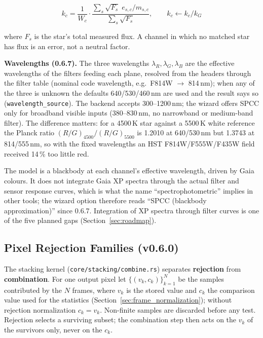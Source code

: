 \documentclass[11pt,a4paper]{article}
\newcommand{\code}[1]{\texttt{\small #1}}
\begin{document}
    \begin{equation}
        \boxed{
            k_c = \frac{1}{W_c} \cdot \frac{\sum_s \sqrt{F_s}\; e_{s,c} / m_{s,c}}{\sum_s \sqrt{F_s}}, \qquad k_c \leftarrow k_c / k_G
        }
    \end{equation}

    where $F_s$ is the star's total measured flux. A channel in which no matched star has flux is an error, not a neutral factor.

    \textbf{Wavelengths (0.6.7).} The three wavelengths $\lambda_R, \lambda_G, \lambda_B$ are the effective wavelengths of the filters feeding each plane, resolved from the headers through the filter table (nominal code wavelength, e.g.\ F814W $\to$ 814\,nm); when any of the three is unknown the defaults 640/530/460\,nm are used and the result says so (\code{wavelength\_source}). The backend accepts 300--1200\,nm; the wizard offers SPCC only for broadband visible inputs (380--830\,nm, no narrowband or medium-band filter). The difference matters: for a 4500\,K star against a 5500\,K white reference the Planck ratio $(R/G)_{4500}/(R/G)_{5500}$ is 1.2010 at 640/530\,nm but 1.3743 at 814/555\,nm, so with the fixed wavelengths an HST F814W/F555W/F435W field received 14\,\% too little red.

    \begin{notebox}
        The model is a blackbody at each channel's effective wavelength, driven by Gaia colours. It does not integrate Gaia XP spectra through the actual filter and sensor response curves, which is what the name ``spectrophotometric'' implies in other tools; the wizard option therefore reads ``SPCC (blackbody approximation)'' since 0.6.7. Integration of XP spectra through filter curves is one of the five planned gaps (Section~\ref{sec:roadmap}).
    \end{notebox}


    \subsection{Pixel Rejection Families (v0.6.0)}
    \label{sec:rejection_families}

    The stacking kernel (\code{core/stacking/combine.rs}) separates \textbf{rejection} from \textbf{combination}. For one output pixel let $\{(v_k, c_k)\}_{k=1}^{N}$ be the samples contributed by the $N$ frames, where $v_k$ is the stored value and $c_k$ the comparison value used for the statistics (Section~\ref{sec:frame_normalization}); without rejection normalization $c_k = v_k$. Non-finite samples are discarded before any test. Rejection selects a surviving subset; the combination step then acts on the $v_k$ of the survivors only, never on the $c_k$.
\end{document}

